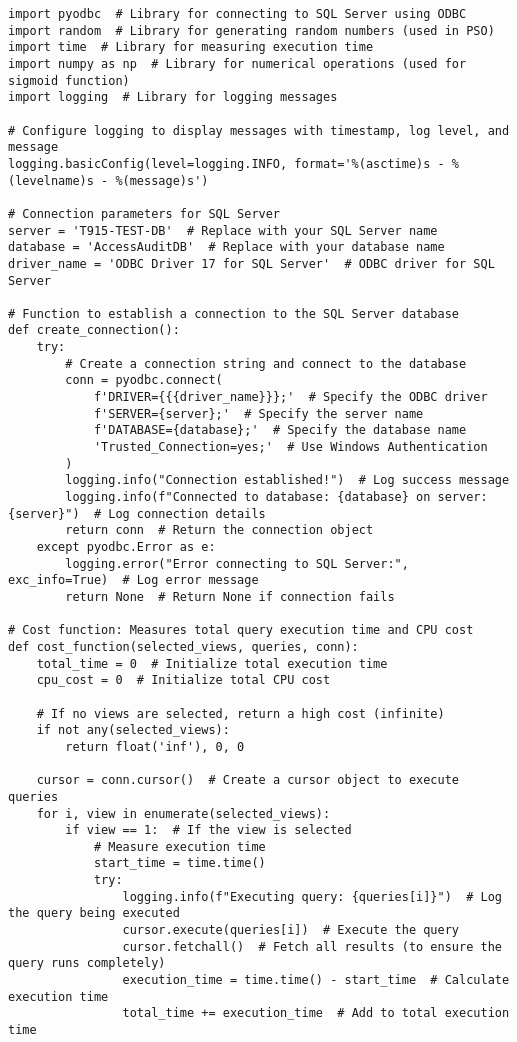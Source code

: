 \begin{lstlisting}[style=pythonstyle, caption={Python script to automate optimal view.}, label={lst:fullCode}]
import pyodbc  # Library for connecting to SQL Server using ODBC
import random  # Library for generating random numbers (used in PSO)
import time  # Library for measuring execution time
import numpy as np  # Library for numerical operations (used for sigmoid function)
import logging  # Library for logging messages

# Configure logging to display messages with timestamp, log level, and message
logging.basicConfig(level=logging.INFO, format='%(asctime)s - %(levelname)s - %(message)s')

# Connection parameters for SQL Server
server = 'T915-TEST-DB'  # Replace with your SQL Server name
database = 'AccessAuditDB'  # Replace with your database name
driver_name = 'ODBC Driver 17 for SQL Server'  # ODBC driver for SQL Server

# Function to establish a connection to the SQL Server database
def create_connection():
    try:
        # Create a connection string and connect to the database
        conn = pyodbc.connect(
            f'DRIVER={{{driver_name}}};'  # Specify the ODBC driver
            f'SERVER={server};'  # Specify the server name
            f'DATABASE={database};'  # Specify the database name
            'Trusted_Connection=yes;'  # Use Windows Authentication
        )
        logging.info("Connection established!")  # Log success message
        logging.info(f"Connected to database: {database} on server: {server}")  # Log connection details
        return conn  # Return the connection object
    except pyodbc.Error as e:
        logging.error("Error connecting to SQL Server:", exc_info=True)  # Log error message
        return None  # Return None if connection fails

# Cost function: Measures total query execution time and CPU cost
def cost_function(selected_views, queries, conn):
    total_time = 0  # Initialize total execution time
    cpu_cost = 0  # Initialize total CPU cost

    # If no views are selected, return a high cost (infinite)
    if not any(selected_views):
        return float('inf'), 0, 0

    cursor = conn.cursor()  # Create a cursor object to execute queries
    for i, view in enumerate(selected_views):
        if view == 1:  # If the view is selected
            # Measure execution time
            start_time = time.time()
            try:
                logging.info(f"Executing query: {queries[i]}")  # Log the query being executed
                cursor.execute(queries[i])  # Execute the query
                cursor.fetchall()  # Fetch all results (to ensure the query runs completely)
                execution_time = time.time() - start_time  # Calculate execution time
                total_time += execution_time  # Add to total execution time


\end{lstlisting}
